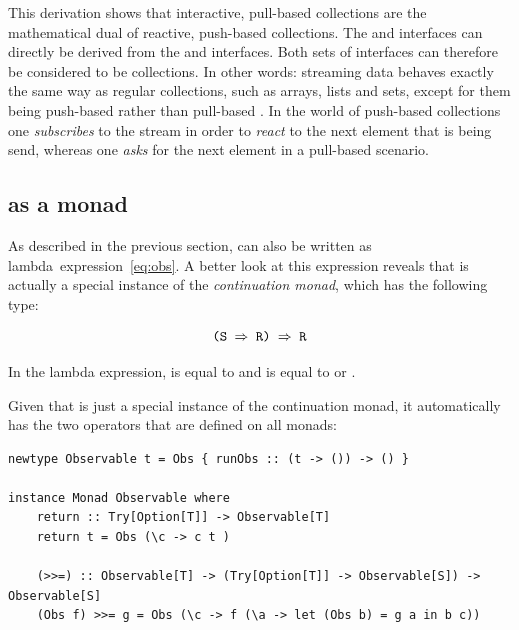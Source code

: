 
This derivation shows that interactive, pull-based collections are the mathematical dual of reactive, push-based collections. The \obs and \obv interfaces can directly be derived from the \ieb and \ier interfaces. Both sets of interfaces can therefore be considered to be collections. In other words: streaming data behaves exactly the same way as regular collections, such as arrays, lists and sets, except for them being push-based rather than pull-based \cite{meijer2012-YMIAD, meijer2010-Observable}. In the world of push-based collections one \emph{subscribes} to the stream in order to \emph{react} to the next element that is being send, whereas one \emph{asks} for the next element in a pull-based scenario.

\subsection{\obs as a monad}
\label{subsec:obs-monad}
As described in the previous section, \obs can also be written as lambda~expression~\ref{eq:obs}. A better look at this expression reveals that \obs is actually a special instance of the \textit{continuation monad}, which has the following type:

\begin{equation} \label{eq:cont}
\code{(S $\Rightarrow$ R) $\Rightarrow$ R}
\end{equation}

In the \obs lambda expression,  is equal to  and  is equal to \code{()} or .

Given that \obs is just a special instance of the continuation monad, it automatically has the two operators that are defined on all monads:

\begin{minipage}{\linewidth}
\begin{lstlisting}[style=HaskellStyle, caption={\obs as monad}, label={lst:obs-monad}]
newtype Observable t = Obs { runObs :: (t -> ()) -> () }

instance Monad Observable where 
    return :: Try[Option[T]] -> Observable[T]
    return t = Obs (\c -> c t )

    (>>=) :: Observable[T] -> (Try[Option[T]] -> Observable[S]) -> Observable[S]
    (Obs f) >>= g = Obs (\c -> f (\a -> let (Obs b) = g a in b c))
\end{lstlisting}
\end{minipage}

